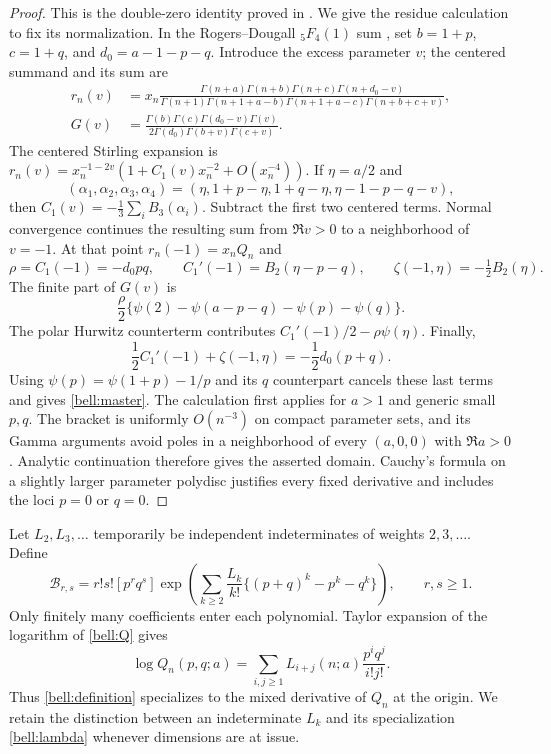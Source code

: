 \documentclass[11pt,a4paper]{article}
\numberwithin{equation}{section}
\theoremstyle{definition}
\theoremstyle{remark}
\begin{document}
\begin{proof}
This is the double-zero identity proved in \cite{RepoMixed}. We give
the residue calculation to fix its normalization. In the Rogers--Dougall
${}_5F_4(1)$ sum \cite[16.4.9]{DLMFDougall}, set
$b=1+p$, $c=1+q$, and $d_0=a-1-p-q$. Introduce the excess parameter $v$;
the centered summand and its sum are
\begin{align*}
 r_n(v)&=x_n\frac{\Gamma(n+a)\Gamma(n+b)\Gamma(n+c)
                           \Gamma(n+d_0-v)}
 {\Gamma(n+1)\Gamma(n+1+a-b)\Gamma(n+1+a-c)
                           \Gamma(n+b+c+v)},\\
 G(v)&=\frac{\Gamma(b)\Gamma(c)\Gamma(d_0-v)\Gamma(v)}
 {2\Gamma(d_0)\Gamma(b+v)\Gamma(c+v)}.
\end{align*}
The centered Stirling expansion \cite{DLMFGammaAsymptotic} is
$r_n(v)=x_n^{-1-2v}(1+C_1(v)x_n^{-2}+O(x_n^{-4}))$.
If $\eta=a/2$ and
\[
 (\alpha_1,\alpha_2,\alpha_3,\alpha_4)
 =(\eta,1+p-\eta,1+q-\eta,\eta-1-p-q-v),
\]
then $C_1(v)=-\tfrac13\sum_i B_3(\alpha_i)$.
Subtract the first two centered terms. Normal convergence continues
the resulting sum from $\Re v>0$ to a neighborhood of $v=-1$.
At that point $r_n(-1)=x_nQ_n$ and
\[
 \rho=C_1(-1)=-d_0pq,\qquad
 C_1'(-1)=B_2(\eta-p-q),\qquad
 \zeta(-1,\eta)=-\tfrac12B_2(\eta).
\]
The finite part of $G(v)$ is
\[
 \frac\rho2\{\psi(2)-\psi(a-p-q)-\psi(p)-\psi(q)\}.
\]
The polar Hurwitz counterterm contributes
$C_1'(-1)/2-\rho\psi(\eta)$. Finally,
\[
 \frac12C_1'(-1)+\zeta(-1,\eta)
                  =-\frac12d_0(p+q).
\]
Using $\psi(p)=\psi(1+p)-1/p$ and its $q$ counterpart cancels
these last terms and gives \eqref{bell:master}.
The calculation first applies for $a>1$ and generic small $p,q$.
The bracket is uniformly $O(n^{-3})$ on compact parameter sets, and its
Gamma arguments avoid poles in a neighborhood of every $(a,0,0)$
with $\Re a>0$. Analytic continuation therefore gives the asserted
domain. Cauchy's formula on a slightly larger parameter polydisc
justifies every fixed derivative and includes the loci $p=0$ or $q=0$.
\end{proof}

Let $L_2,L_3,\ldots$ temporarily be independent indeterminates of
weights $2,3,\ldots$. Define
\begin{equation}
 \mathcal B_{r,s}
 =r!s![p^rq^s]\exp\left(
  \sum_{k\ge2}\frac{L_k}{k!}\{(p+q)^k-p^k-q^k\}\right),
 \qquad r,s\ge1.
 \label{bell:definition}
\end{equation}
Only finitely many coefficients enter each polynomial. Taylor expansion
of the logarithm of \eqref{bell:Q} gives
\[
 \log Q_n(p,q;a)
 =\sum_{i,j\ge1}L_{i+j}(n;a)\frac{p^iq^j}{i!j!}.
\]
Thus \eqref{bell:definition} specializes to the mixed derivative of
$Q_n$ at the origin. We retain the distinction between an indeterminate
$L_k$ and its specialization \eqref{bell:lambda} whenever dimensions
are at issue.
\end{document}
